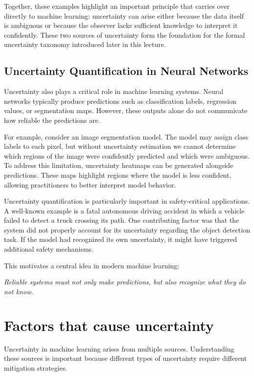 \documentclass{article}
\begin{document}
Together, these examples highlight an important principle that carries over directly to machine learning: uncertainty can arise either because the data itself is ambiguous or because the observer lacks sufficient knowledge to interpret it confidently. These two sources of uncertainty form the foundation for the formal uncertainty taxonomy introduced later in this lecture.

\subsection{Uncertainty Quantification in Neural Networks}

Uncertainty also plays a critical role in machine learning systems. Neural networks typically produce predictions such as classification labels, regression values, or segmentation maps. However, these outputs alone do not communicate how reliable the predictions are.

For example, consider an image segmentation model. The model may assign class labels to each pixel, but without uncertainty estimation we cannot determine which regions of the image were confidently predicted and which were ambiguous. To address this limitation, uncertainty heatmaps can be generated alongside predictions. These maps highlight regions where the model is less confident, allowing practitioners to better interpret model behavior.

Uncertainty quantification is particularly important in safety-critical applications. A well-known example is a fatal autonomous driving accident in which a vehicle failed to detect a truck crossing its path. One contributing factor was that the system did not properly account for its uncertainty regarding the object detection task. If the model had recognized its own uncertainty, it might have triggered additional safety mechanisms.

This motivates a central idea in modern machine learning:

\begin{center}
\textit{Reliable systems must not only make predictions, but also recognize what they do not know.}
\end{center}

\section{Factors that cause uncertainty}
\label{sec:27.3}

Uncertainty in machine learning arises from multiple sources. Understanding these sources is important because different types of uncertainty require different mitigation strategies.
\end{document}
